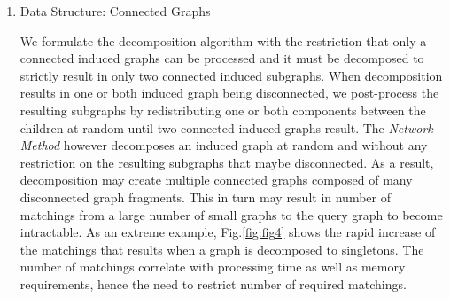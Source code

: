 \begin{enumerate}
\begin{enumerate}



\item Data Structure: Connected Graphs

We formulate the decomposition algorithm with the restriction that only a connected induced graphs can be processed and it must be decomposed to strictly result in only two connected induced subgraphs. 
When decomposition results in one or both induced graph being disconnected, we post-process the resulting subgraphs by redistributing one or both components between the children at random until two connected induced graphs result.
The \textit{Network Method} however decomposes an induced graph at random and without any restriction on the resulting subgraphs that maybe disconnected.
As a result, decomposition may create multiple connected graphs composed of many disconnected graph fragments. 
This in turn may result in number of matchings from a large number of small graphs to the query graph to become intractable.
As an extreme example, Fig.\ref{fig:fig4} shows the rapid increase of the matchings that results when a graph is decomposed to singletons.
The number of matchings correlate with processing time as well as memory requirements, hence the need to restrict number of required matchings. 



\end{enumerate}
\end{enumerate}
